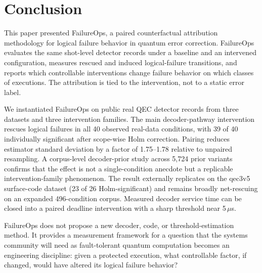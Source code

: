 \section{Conclusion}

This paper presented FailureOps, a paired counterfactual attribution methodology for logical failure behavior in quantum error correction. FailureOps evaluates the same shot-level detector records under a baseline and an intervened configuration, measures rescued and induced logical-failure transitions, and reports which controllable interventions change failure behavior on which classes of executions. The attribution is tied to the intervention, not to a static error label.

We instantiated FailureOps on public real QEC detector records from three datasets and three intervention families. The main decoder-pathway intervention rescues logical failures in all 40 observed real-data conditions, with 39 of 40 individually significant after scope-wise Holm correction. Pairing reduces estimator standard deviation by a factor of 1.75--1.78 relative to unpaired resampling. A corpus-level decoder-prior study across 5,724 prior variants confirms that the effect is not a single-condition anecdote but a replicable intervention-family phenomenon. The result externally replicates on the qec3v5 surface-code dataset (23 of 26 Holm-significant) and remains broadly net-rescuing on an expanded 496-condition corpus. Measured decoder service time can be closed into a paired deadline intervention with a sharp threshold near 5\,$\mu$s.

FailureOps does not propose a new decoder, code, or threshold-estimation method. It provides a measurement framework for a question that the systems community will need as fault-tolerant quantum computation becomes an engineering discipline: given a protected execution, what controllable factor, if changed, would have altered its logical failure behavior?
